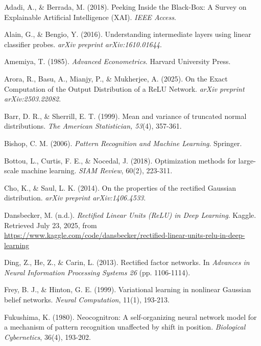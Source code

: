 \begin{thebibliography}{99}

Adadi, A., \& Berrada, M. (2018). Peeking Inside the Black-Box: A Survey on Explainable Artificial Intelligence (XAI). \textit{IEEE Access}.

Alain, G., \& Bengio, Y. (2016). Understanding intermediate layers using linear classifier probes. \textit{arXiv preprint arXiv:1610.01644}.

Amemiya, T. (1985). \textit{Advanced Econometrics}. Harvard University Press.

Arora, R., Basu, A., Mianjy, P., \& Mukherjee, A. (2025). On the Exact Computation of the Output Distribution of a ReLU Network. \textit{arXiv preprint arXiv:2503.22082}.

Barr, D. R., \& Sherrill, E. T. (1999). Mean and variance of truncated normal distributions. \textit{The American Statistician, 53}(4), 357-361.

Bishop, C. M. (2006). \textit{Pattern Recognition and Machine Learning}. Springer.

Bottou, L., Curtis, F. E., \& Nocedal, J. (2018). Optimization methods for large-scale machine learning. \textit{SIAM Review}, 60(2), 223-311.

Cho, K., \& Saul, L. K. (2014). On the properties of the rectified Gaussian distribution. \textit{arXiv preprint arXiv:1406.4533}.

Dansbecker, M. (n.d.). \textit{Rectified Linear Units (ReLU) in Deep Learning}. Kaggle. Retrieved July 23, 2025, from \url{https://www.kaggle.com/code/dansbecker/rectified-linear-units-relu-in-deep-learning}

Ding, Z., He, Z., \& Carin, L. (2013). Rectified factor networks. In \textit{Advances in Neural Information Processing Systems 26} (pp. 1106-1114).

Frey, B. J., \& Hinton, G. E. (1999). Variational learning in nonlinear Gaussian belief networks. \textit{Neural Computation}, 11(1), 193-213.

Fukushima, K. (1980). Neocognitron: A self-organizing neural network model for a mechanism of pattern recognition unaffected by shift in position. \textit{Biological Cybernetics}, 36(4), 193-202.


\end{thebibliography}
